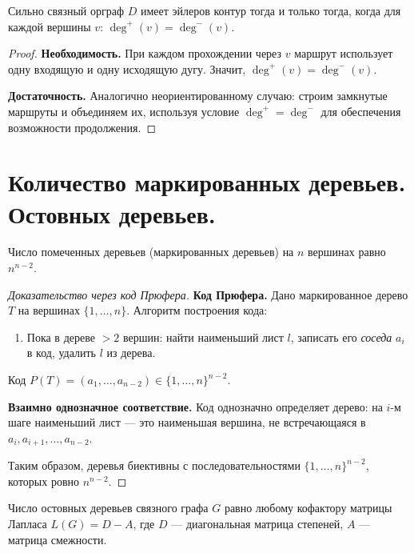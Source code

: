 \documentclass[12pt]{article}
\begin{document}
\begin{theorem}
Сильно связный орграф $D$ имеет эйлеров контур тогда и только тогда,
когда для каждой вершины $v$:
$\deg^+(v) = \deg^-(v)$.
\end{theorem}

\begin{proof}
\textbf{Необходимость.} При каждом прохождении через $v$
маршрут использует одну входящую и одну исходящую дугу.
Значит, $\deg^+(v) = \deg^-(v)$.

\textbf{Достаточность.} Аналогично неориентированному случаю:
строим замкнутые маршруты и объединяем их, используя условие
$\deg^+ = \deg^-$ для обеспечения возможности продолжения.
\end{proof}

\section{Количество маркированных деревьев. Остовных деревьев.}

\begin{theorem}[Кэли, 1889]
Число помеченных деревьев (маркированных деревьев) на $n$ вершинах
равно $n^{n-2}$.
\end{theorem}

\begin{proof}[Доказательство через код Прюфера]
\textbf{Код Прюфера.} Дано маркированное дерево $T$ на вершинах
$\{1,\ldots,n\}$. Алгоритм построения кода:
\begin{enumerate}
\item Пока в дереве $> 2$ вершин:
      найти наименьший лист $l$, записать его \emph{соседа} $a_i$
      в код, удалить $l$ из дерева.
\end{enumerate}
Код $P(T) = (a_1,\ldots,a_{n-2}) \in \{1,\ldots,n\}^{n-2}$.

\textbf{Взаимно однозначное соответствие.}
Код однозначно определяет дерево:
на $i$-м шаге наименьший лист --- это наименьшая вершина,
не встречающаяся в $a_i,a_{i+1},\ldots,a_{n-2}$.

Таким образом, деревья биективны с последовательностями
$\{1,\ldots,n\}^{n-2}$, которых ровно $n^{n-2}$.
\end{proof}

\begin{theorem}
Число остовных деревьев связного графа $G$ равно любому
кофактору матрицы Лапласа $L(G) = D - A$, где $D$ ---
диагональная матрица степеней, $A$ --- матрица смежности.
\end{theorem}
\end{document}

